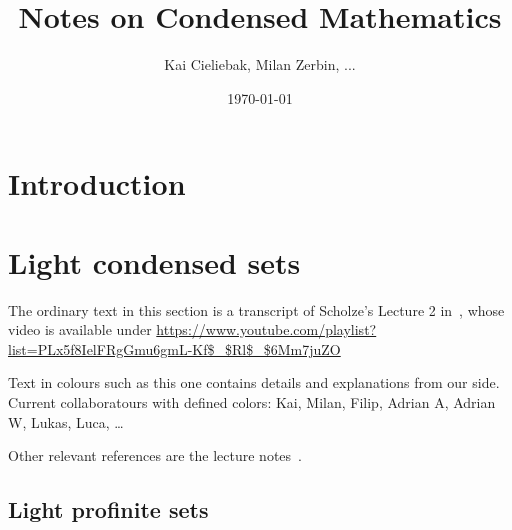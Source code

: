 \documentclass{notes}
\begin{document}
\title{Notes on Condensed Mathematics} 
\author{Kai Cieliebak, Milan Zerbin, ...}
\date{\today}



\maketitle


\section{Introduction}\label{sec:intro}

\section{Light condensed sets}\label{sec:light-condensed-sets}

The ordinary text in this section is a transcript of Scholze's Lecture
2 in~\cite{videos}, whose video is available under
\url{https://www.youtube.com/playlist?list=PLx5f8IelFRgGmu6gmL-Kf$\_$Rl$\_$6Mm7juZO}

Text in colours such as {\kai this one} contains details and
explanations from our side.
Current collaboratours with defined colors:
{\kai Kai}, %
{\milan Milan}, %
{\filip Filip}, %
{\sadrian Adrian A}, %
{\adrian Adrian W}, %
{\lukas Lukas},
{\luca Luca}, %
\dots

Other relevant references are the lecture
notes~\cite{analytic,condensed,complex}. 

\subsection{Light profinite sets}


\textcolor{black}{}
\end{document}
